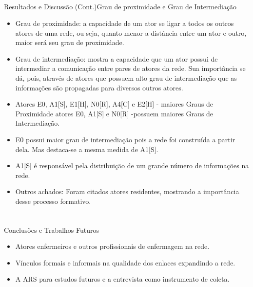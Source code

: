 \documentclass[10pt]{beamer}
\begin{document}
\subsection{}
\begin{frame}{Resultados e Discussão (Cont.)}{Grau de proximidade e Grau de Intermediação}
  \begin{itemize}
    \item Grau de proximidade: a capacidade de um ator se ligar a todos os outros atores de uma rede, ou seja, quanto menor a distância entre um ator e outro, maior será seu grau de proximidade.
    \item Grau de intermediação: mostra a capacidade que um ator possui de intermediar a  comunicação entre pares de atores da rede. Sua importância se dá, pois, através de atores que possuem alto grau de intermediação que as informações são propagadas para diversos outros atores.
    \item Atores E0, A1[S], E1[H], N0[R], A4[C] e E2[H] - maiores Graus de Proximidade atores E0, A1[S] e N0[R] -possuem maiores Graus de Intermediação.
    \item E0 possui maior grau de intermediação pois a rede foi construída a partir dela. Mas destaca-se a mesma medida de A1[S]. 
    \item A1[S] é responsável pela distribuição de um grande número de informações na rede. 
    \item Outros achados: Foram citados atores residentes, mostrando a importância desse processo formativo.
    \end{itemize}
\end{frame}


\section{}
\subsection{}
\begin{frame}{Conclusões e Trabalhos Futuros}{}
  \begin{itemize}
    \item Atores enfermeiros e outros profissionais de enfermagem na rede.
    \item Vínculos formais e informais na qualidade dos enlaces expandindo a rede.
    \item A ARS para estudos futuros e a entrevista como instrumento de coleta.
    \end{itemize}
\end{frame}
\end{document}
